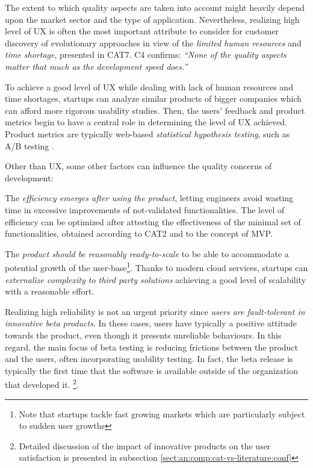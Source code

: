 \documentclass[10pt,journal,letterpaper,compsoc]{IEEEtran}
\begin{document}
The extent to which quality aspects are taken into account might heavily depend
upon the market sector and the type of application. Nevertheless, realizing high
level of UX  is often the most important attribute to consider for customer
discovery of  evolutionary approaches in view of the \textit{limited human
resources} and \textit{time shortage}, presented in CAT7. C4 confirms:
\textit{``None of the quality aspects matter that much as the development speed
does.''}

To achieve a good level of UX while dealing with lack of human resources and
time shortages, startups can analyze similar products of bigger companies which
can afford more rigorous usability studies. Then, the users' feedback and
product metrics begin to have a central role in determining the level of UX
achieved. Product metrics are typically web-based \textit{statistical hypothesis
testing}, such as A/B testing \cite{AB}.

Other than UX, some other factors can influence the quality concerns of
development:


\begin{compactitem}

\item The \textit{efficiency emerges after using the product}, letting
engineers avoid wasting time in excessive improvements of not-validated
functionalities. The level of efficiency can be optimized after attesting the
effectiveness of the minimal set of functionalities, obtained according to CAT2
and to the concept of MVP. 
\item The \textit{product should be reasonably ready-to-scale} to be able to  
accommodate a potential growth of the user-base\footnote{Note that startups  
tackle fast growing markets which are particularly subject to sudden user  
growths}. Thanks to modern cloud services, startups can \textit{externalize  
complexity to third party solutions} achieving a good level of scalability with 
a reasonable effort. 
\item Realizing high reliability is not an urgent priority since \textit{users  
are fault-tolerant in innovative beta products}. In these cases, users have  
typically a positive attitude towards the product, even though it presents  
unreliable behaviours. In this regard, the main focus of beta testing is 
reducing frictions between the product and the users, often incorporating  
usability testing. In fact, the beta release is typically the first time that  
the software is available outside of the organization that developed it.  
\footnote{Detailed discussion of the impact of innovative products on the user  
satisfaction is presented in subsection 
\ref{sect:an:comp:cat-vs-literature:conf}}. 
\end{compactitem}
\end{document}
